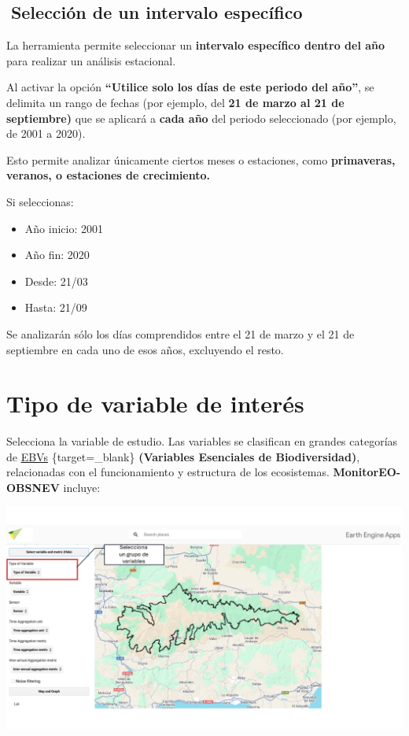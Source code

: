 \documentclass[
]{book}
\providecommand{\tightlist}{%
  \setlength{\itemsep}{0pt}\setlength{\parskip}{0pt}}
\begin{document}
\section{\texorpdfstring{\textbf{📆Selección de un intervalo específico}}{📆Selección de un intervalo específico}}\label{selecciuxf3n-de-un-intervalo-especuxedfico}

La herramienta permite seleccionar un \textbf{intervalo específico dentro del año} para realizar un análisis estacional.

Al activar la opción \textbf{``Utilice solo los días de este periodo del año''}, se delimita un rango de fechas (por ejemplo, del \textbf{21 de marzo al 21 de septiembre)} que se aplicará a \textbf{cada año} del periodo seleccionado (por ejemplo, de 2001 a 2020).

Esto permite analizar únicamente ciertos meses o estaciones, como \textbf{primaveras, veranos, o estaciones de crecimiento.}

Si seleccionas:

\begin{itemize}
\tightlist
\item
  Año inicio: 2001\\
\item
  Año fin: 2020\\
\item
  Desde: 21/03\\
\item
  Hasta: 21/09
\end{itemize}

Se analizarán sólo los días comprendidos entre el 21 de marzo y el 21 de septiembre en cada uno de esos años, excluyendo el resto.

\chapter{Tipo de variable de interés}\label{tipo-variable}

Selecciona la variable de estudio. Las variables se clasifican en grandes categorías de \href{https://geobon.org/ebvs/what-are-ebvs/}{EBVs} \{target=\_blank\} \textbf{(Variables Esenciales de Biodiversidad)}, relacionadas con el funcionamiento y estructura de los ecosistemas. \textbf{MonitorEO-OBSNEV} incluye:

\includegraphics{assets/variables_es.png}
\end{document}
